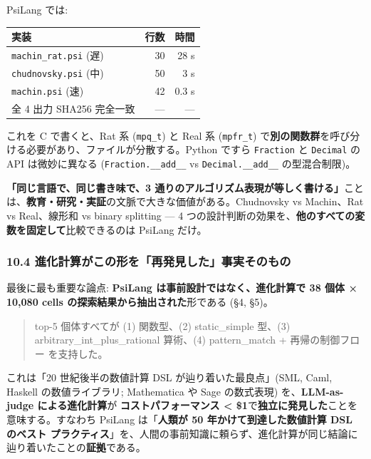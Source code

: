 \documentclass[
]{ltjsarticle}
\newcounter{none} %
\begin{document}
PsiLang では:

{\def\LTcaptype{none} %
\begin{longtable}[]{@{}lrr@{}}
\toprule\noalign{}
実装 & 行数 & 時間 \\
\midrule\noalign{}
\endhead
\bottomrule\noalign{}
\endlastfoot
\texttt{machin\_rat.psi} (遅) & 30 & 28 s \\
\texttt{chudnovsky.psi} (中) & 50 & 3 s \\
\texttt{machin.psi} (速) & 42 & 0.3 s \\
全 4 出力 SHA256 完全一致 & --- & --- \\
\end{longtable}
}

これを C で書くと、Rat 系 (\texttt{mpq\_t}) と Real 系
(\texttt{mpfr\_t})
で\textbf{別の関数群}を呼び分ける必要があり、ファイルが分散する。Python
ですら \texttt{Fraction} と \texttt{Decimal} の API は微妙に異なる
(\texttt{Fraction.\_\_add\_\_} vs \texttt{Decimal.\_\_add\_\_}
の型混合制限)。

\textbf{「同じ言語で、同じ書き味で、3
通りのアルゴリズム表現が等しく書ける」}ことは、\textbf{教育・研究・実証}の文脈で大きな価値がある。Chudnovsky
vs Machin、Rat vs Real、線形和 vs binary splitting --- 4
つの設計判断の効果を、\textbf{他のすべての変数を固定して}比較できるのは
PsiLang だけ。

\subsubsection{10.4
進化計算がこの形を「再発見した」事実そのもの}\label{ux9032ux5316ux8a08ux7b97ux304cux3053ux306eux5f62ux3092ux518dux767aux898bux3057ux305fux4e8bux5b9fux305dux306eux3082ux306e}

最後に最も重要な論点: \textbf{PsiLang は事前設計ではなく、進化計算で 38
個体 × 10,080 cells の探索結果から抽出された}形である (§4, §5)。

\begin{quote}
top-5 個体すべてが (1) 関数型、(2) static\_simple 型、(3)
arbitrary\_int\_plus\_rational 算術、(4) pattern\_match +
再帰の制御フロー を支持した。
\end{quote}

これは「20 世紀後半の数値計算 DSL が辿り着いた最良点」(SML, Caml,
Haskell の数値ライブラリ; Mathematica や Sage の数式表現)
を、\textbf{LLM-as-judge による進化計算}が \textbf{コストパフォーマンス
\textless{} \$1}で\textbf{独立に発見した}ことを意味する。すなわち
PsiLang は「\textbf{人類が 50 年かけて到達した数値計算 DSL のベスト
プラクティス}」を、人間の事前知識に頼らず、進化計算が同じ結論に辿り着いたことの\textbf{証拠}である。
\end{document}
